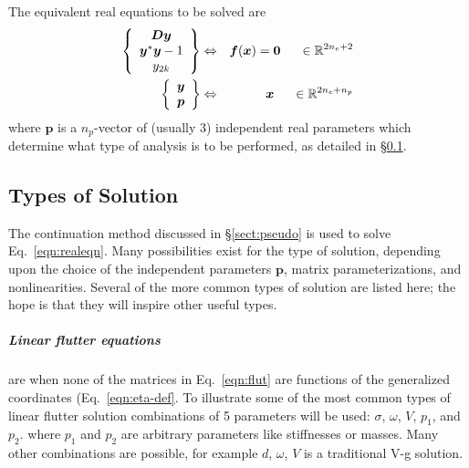 \documentclass[11pt,openany,twoside]{book}
\numberwithin{equation}{section}		%
\newcommand{\Vector}[1]{\boldsymbol{#1}}
\newcommand{\Sectref}[1]{\S\ref{#1}}
\newcommand{\Eqn}[1]{Eq.\ \ref{#1}}  %
\begin{document}
The equivalent real equations to be solved are
\begin{eqnarray}\label{eqn:realeqn}
\left\{\begin{array}{c}
	\Vector{Dy} \\
	\Vector{y}^*\Vector{y} - 1 \\
	y_{2k} \\
\end{array} \right\} & \Leftrightarrow & \Vector{f}(\Vector{x}) = \Vector{0} \hspace{0.2in} \in \mathbb{R}^{2n_e+2} \nonumber \\
\left\{\begin{array}{c}
\Vector{y} \\
\Vector{p} \\
\end{array} \right\} & \Leftrightarrow & \Vector{x} \hspace{0.2in} \in \mathbb{R}^{2n_e+n_p}
\end{eqnarray}
where $\Vector{p}$ is a $n_p$-vector of (usually 3) independent
real parameters which determine what type of analysis is to be performed,
as detailed in \Sectref{sect:soln-types}.

\subsection{Types of Solution}\label{sect:soln-types}
The continuation method discussed in \Sectref{sect:pseudo}
is used to solve \Eqn{eqn:realeqn}.
Many possibilities exist for the type of solution, depending upon the
choice of the independent parameters $\Vector{p}$, matrix parameterizations,
and nonlinearities. Several of the more common types of solution are
listed here; the hope is that they will inspire other useful types.

\subparagraph{Linear flutter equations}\label{sect:app-linear}
are when none of the matrices in \Eqn{eqn:flut} are functions of
the generalized coordinates (\Eqn{eqn:eta-def}.
To illustrate some of the most common types of linear flutter solution
combinations of 5 parameters will be used:
$\sigma$, $\omega$, $V$, $p_1$, and $p_2$.  where $p_1$ and $p_2$
are arbitrary parameters like stiffnesses or masses.
Many other combinations are possible, for example
$d$, $\omega$, $V$ is a traditional V-g solution.
\end{document}
